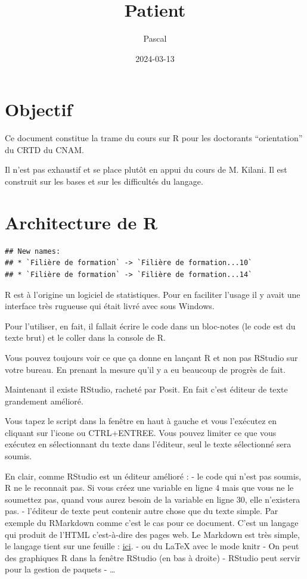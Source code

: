 \documentclass[
]{book}
\title{Patient}
\author{Pascal}
\date{2024-03-13}
\begin{document}
\maketitle

{
\setcounter{tocdepth}{1}
\tableofcontents
}
\hypertarget{objectif}{%
\chapter{Objectif}\label{objectif}}

Ce document constitue la trame du cours sur R pour les doctorants ``orientation''
du CRTD du CNAM.

Il n'est pas exhaustif et se place plutôt en appui du cours de M. Kilani. Il est
construit sur les bases et sur les difficultés du langage.

\hypertarget{architecture-de-r}{%
\chapter{Architecture de R}\label{architecture-de-r}}

\begin{verbatim}
## New names:
## * `Filière de formation` -> `Filière de formation...10`
## * `Filière de formation` -> `Filière de formation...14`
\end{verbatim}

R est à l'origine un logiciel de statistiques. Pour en faciliter l'usage il y
avait une interface très rugueuse qui était livré avec sous Windows.

Pour l'utiliser, en fait, il fallait écrire le code dans un bloc-notes (le code
est du texte brut) et le coller dans la console de R.

Vous pouvez toujours voir ce que ça donne en lançant R et non pas RStudio
sur votre bureau. En prenant la mesure qu'il y a eu beaucoup de progrès de fait.

Maintenant il existe RStudio, racheté par Posit. En fait c'est éditeur de texte
grandement amélioré.

Vous tapez le script dans la fenêtre en haut à gauche et vous l'exécutez en
cliquant sur l'icone ou CTRL+ENTREE. Vous pouvez limiter ce que vous exécutez
en sélectionnant du texte dans l'éditeur, seul le texte sélectionné sera soumis.

En clair, comme RStudio est un éditeur amélioré :
- le code qui n'est pas soumis, R ne le reconnait pas. Si vous créez une variable
en ligne 4 mais que vous ne le soumettez pas, quand vous aurez besoin de la
variable en ligne 30, elle n'existera pas.
- l'éditeur de texte peut contenir autre chose que du texte simple. Par exemple
du RMarkdown comme c'est le cas pour ce document. C'est un langage qui produit
de l'HTML c'est-à-dire des pages web. Le Markdown est très simple, le langage
tient sur une feuille : \href{https://www.markdownguide.org/cheat-sheet/}{ici}.
- ou du LaTeX avec le mode knitr
- On peut des graphiques R dans la fenêtre RStudio (en bas à droite)
- RStudio peut servir pour la gestion de paquets
- \ldots{}
\end{document}
